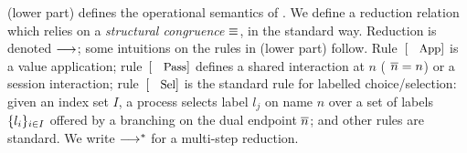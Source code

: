 \smallskip
\noindent {}
	 (lower part) defines the operational semantics 
of \HOp.
We define a reduction relation which relies 
on 
a \emph{structural congruence} $\equiv$, in the standard way. %
Reduction is denoted $\longrightarrow$; some intuitions on the rules in  (lower part) follow.
Rule~$\orule{App}$ is a value application; 
rule~$\orule{Pass}$ defines a shared interaction at $n$ 
( $\overline{n}=n$) or a session interaction;  
rule~$\orule{Sel}$ is the standard rule for labelled choice/selection:
given an index set $I$, 
a process selects label $l_j$ on name $n$ over a set of
labels $\{l_i\}_{i \in I}$ offered by a branching 
on the dual endpoint $\overline{n}$; and other rules are standard.
We write $\longrightarrow^\ast$ for a multi-step reduction. 


